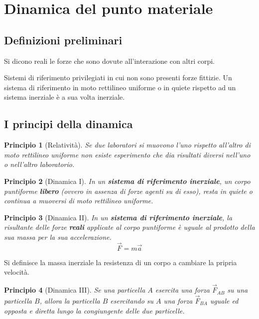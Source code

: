 \documentclass{article}
\newtheorem*{principio}{Principio}
\theoremstyle{plain}
\begin{document}
\section{Dinamica del punto materiale}
\subsection{Definizioni preliminari}
\begin{boxdef}
    Si dicono reali le forze che sono dovute all'interazione con altri corpi.
\end{boxdef}
\begin{boxdef}
    Sistemi di riferimento privilegiati in cui non sono presenti forze fittizie. Un sistema di riferimento in moto rettilineo uniforme o in quiete rispetto ad un sistema inerziale è a sua volta inerziale.
\end{boxdef}
\subsection{I principi della dinamica}
\begin{shaded}
    \begin{principio}[Relatività]
        Se due laboratori si muovono l'uno rispetto all'altro di moto rettilineo uniforme non esiste esperimento che dia risultati diversi nell'uno o nell'altro laboratorio.
    \end{principio}
\end{shaded}

\begin{shaded}
    \begin{principio}[Dinamica I]
        In un \textbf{sistema di riferimento inerziale}, un corpo puntiforme \textbf{libero} (ovvero in assenza di forze agenti su di esso), resta in quiete o continua a muoversi di moto rettilineo uniforme.
    \end{principio}
\end{shaded}

\begin{shaded}
    \begin{principio}[Dinamica II]
        In un \textbf{sistema di riferimento inerziale}, la risultante delle forze \textbf{reali} applicate al corpo puntiforme è uguale al prodotto della sua massa per la sua accelerazione.
        \[\vec F=m\vec a\]
    \end{principio}
\end{shaded}
\begin{definition}
    Si definisce la massa inerziale la resistenza di un corpo a cambiare la pripria velocità.
\end{definition}
\begin{shaded}
    \begin{principio}[Dinamica III]
        Se una particella $A$ esercita una forza $\vec F_{AB}$ su una particella $B$, allora la particella $B$  esercitando su $A$ una forza $\vec F_{BA}$ uguale ed opposta e diretta lungo la congiungente delle due particelle.
    \end{principio}
\end{shaded}
\end{document}
